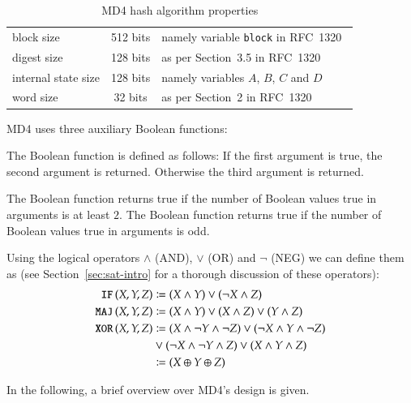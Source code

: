 \begin{table}[h]
  \begin{center}
    \begin{tabular}{lcl}
      block size           & 512 bits       & namely variable \texttt{block} in RFC~1320~\cite{rfc1320} \\
      digest size          & 128 bits       & as per Section~3.5 in RFC~1320~\cite{rfc1320} \\
      internal state size  & 128 bits       & namely variables $A$, $B$, $C$ and $D$ \\
      word size            & 32 bits        & as per Section~2 in RFC~1320~\cite{rfc1320} \\
    \end{tabular}
    \caption{MD4 hash algorithm properties}
    \label{tab:md4}
  \end{center}
\end{table}

MD4 uses three auxiliary Boolean functions:
\begin{defi}
  The Boolean  function is defined as follows:
  If the first argument is true, the second argument is returned.
  Otherwise the third argument is returned.

  The Boolean  function returns true if the number
  of Boolean values true in arguments is at least $2$.
  The Boolean  function returns true if the number
  of Boolean values true in arguments is odd.
\end{defi}

Using the logical operators $\land$ (AND), $\lor$ (OR) and $\neg$ (NEG)
we can define them as (see Section~\ref{sec:sat-intro} for a thorough
discussion of these operators):
\begin{align}
  \operatorname{\texttt{IF\,}}(X,Y,Z) &\coloneqq (X \land Y) \lor (\neg X \land Z) \\
  \operatorname{\texttt{MAJ\,}}(X,Y,Z) &\coloneqq (X \land Y) \lor (X \land Z) \lor (Y \land Z) \\
  \operatorname{\texttt{XOR\,}}(X,Y,Z) &\coloneqq (X \land \neg Y \land \neg Z) \lor (\neg X \land Y \land \neg Z) \nonumber\\
              &\lor (\neg X \land \neg Y \land Z) \lor (X \land Y \land Z) \nonumber\\
              &\coloneqq (X \oplus Y \oplus Z)
\end{align}

In the following, a brief overview over MD4's design is given.

